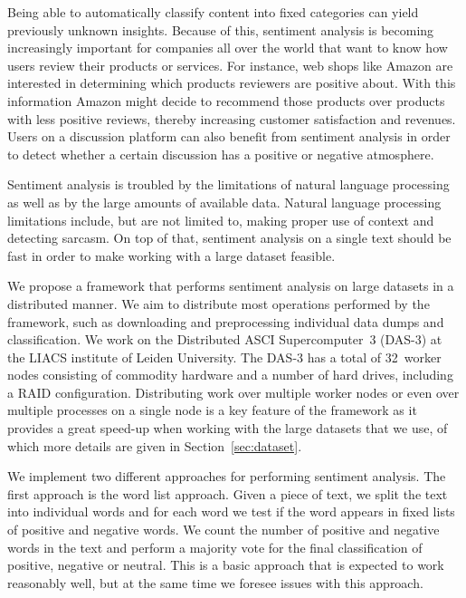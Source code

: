 \documentclass{article}
\begin{document}
Being able to automatically classify content into fixed categories can yield
previously unknown insights. Because of this, sentiment analysis is becoming
increasingly important for companies all over the world that want to know how
users review their products or services. For instance, web shops like Amazon
are interested in determining which products reviewers are positive about.
With this information Amazon might decide to recommend those products over
products with less positive reviews, thereby increasing customer satisfaction
and revenues. Users on a discussion platform can also benefit from sentiment 
analysis in order to detect whether a certain discussion has a positive or 
negative atmosphere.

Sentiment analysis is troubled by the limitations of natural language processing
as well as by the large amounts of available data. Natural language processing
limitations include, but are not limited to, making proper use of context and
detecting sarcasm. On top of that, sentiment analysis on a single text should be
fast in order to make working with a large dataset feasible.

We propose a framework that performs sentiment analysis on large datasets in a
distributed manner. We aim to distribute most operations performed by the 
framework, such as downloading and preprocessing individual data dumps and
classification. We work on the Distributed ASCI Supercomputer~3 (DAS-3) at
the LIACS institute of Leiden University. The DAS-3 has a total of 32~worker 
nodes consisting of commodity hardware and a number of hard drives, including 
a RAID configuration. Distributing work over multiple worker nodes or even over 
multiple processes on a single node is a key feature of the framework as it 
provides a great speed-up when working with the large datasets that we use, of 
which more details are given in Section~\ref{sec:dataset}.

We implement two different approaches for performing sentiment analysis. The
first approach is the word list approach. Given a piece of text, we split the 
text into individual words and for each word we test if the word appears in 
fixed lists of positive and negative words. We count the number of positive and 
negative words in the text and perform a majority vote for the final 
classification of positive, negative or neutral. This is a basic approach that 
is expected to work reasonably well, but at the same time we foresee issues 
with this approach.
\end{document}
